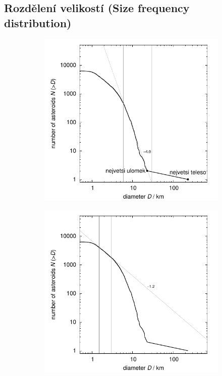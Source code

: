 \documentclass[A4paper, 12pt, oneside]{book}
\begin{document}
\subsection{Rozdělení velikostí (Size frequency distribution)}
\begin{figure}
	\centering
	\begin{subfigure}[b]{0.45\textwidth}
	\includegraphics[width=\textwidth]{obr/size_distribution}
	\end{subfigure}
	\begin{subfigure}[b]{0.45\textwidth}
	\includegraphics[width=\textwidth]{obr/size_distribution_SMALLD}

\end{subfigure}
\end{figure}
\end{document}
